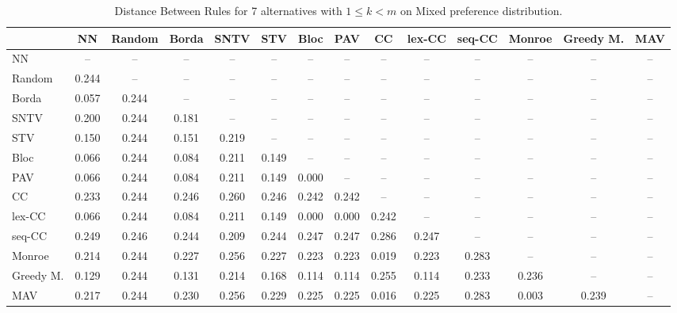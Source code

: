 
\begin{table*}
\centering
\begin{tabular}{lccccccccccccc}
\toprule
 & NN & Random & Borda & SNTV & STV & Bloc & PAV & CC & lex-CC & seq-CC & Monroe & Greedy M. & MAV \\
\midrule
NN & -- & -- & -- & -- & -- & -- & -- & -- & -- & -- & -- & -- & -- \\
Random & 0.244 & -- & -- & -- & -- & -- & -- & -- & -- & -- & -- & -- & -- \\
Borda & 0.057 & 0.244 & -- & -- & -- & -- & -- & -- & -- & -- & -- & -- & -- \\
SNTV & 0.200 & 0.244 & 0.181 & -- & -- & -- & -- & -- & -- & -- & -- & -- & -- \\
STV & 0.150 & 0.244 & 0.151 & 0.219 & -- & -- & -- & -- & -- & -- & -- & -- & -- \\
Bloc & 0.066 & 0.244 & 0.084 & 0.211 & 0.149 & -- & -- & -- & -- & -- & -- & -- & -- \\
PAV & 0.066 & 0.244 & 0.084 & 0.211 & 0.149 & 0.000 & -- & -- & -- & -- & -- & -- & -- \\
CC & 0.233 & 0.244 & 0.246 & 0.260 & 0.246 & 0.242 & 0.242 & -- & -- & -- & -- & -- & -- \\
lex-CC & 0.066 & 0.244 & 0.084 & 0.211 & 0.149 & 0.000 & 0.000 & 0.242 & -- & -- & -- & -- & -- \\
seq-CC & 0.249 & 0.246 & 0.244 & 0.209 & 0.244 & 0.247 & 0.247 & 0.286 & 0.247 & -- & -- & -- & -- \\
Monroe & 0.214 & 0.244 & 0.227 & 0.256 & 0.227 & 0.223 & 0.223 & 0.019 & 0.223 & 0.283 & -- & -- & -- \\
Greedy M. & 0.129 & 0.244 & 0.131 & 0.214 & 0.168 & 0.114 & 0.114 & 0.255 & 0.114 & 0.233 & 0.236 & -- & -- \\
MAV & 0.217 & 0.244 & 0.230 & 0.256 & 0.229 & 0.225 & 0.225 & 0.016 & 0.225 & 0.283 & 0.003 & 0.239 & -- \\
\bottomrule
\end{tabular}

\caption{Distance Between Rules for 7 alternatives with $1 \leq k < m$ on Mixed preference distribution.}
\end{table*}
